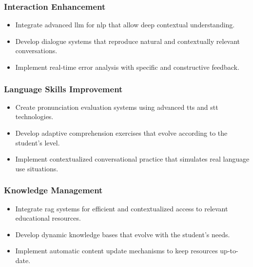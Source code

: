 \subsubsection{Interaction Enhancement}
\label{subsubsec:interaction-enhancement}

\begin{itemize}
  \item Integrate advanced \gls{llm} for \gls{nlp} that allow deep contextual understanding.
  \item Develop dialogue systems that reproduce natural and contextually relevant conversations.
  \item Implement real-time error analysis with specific and constructive feedback.
\end{itemize}

\subsubsection{Language Skills Improvement}
\label{subsubsec:language-skills-improvement}

\begin{itemize}
  \item Create pronunciation evaluation systems using advanced \gls{tts} and \gls{stt} technologies.
  \item Develop adaptive comprehension exercises that evolve according to the student's level.
  \item Implement contextualized conversational practice that simulates real language use situations.
\end{itemize}

\subsubsection{Knowledge Management}
\label{subsubsec:knowledge-management}

\begin{itemize}
  \item Integrate \gls{rag} systems for efficient and contextualized access to relevant educational resources.
  \item Develop dynamic knowledge bases that evolve with the student's needs.
  \item Implement automatic content update mechanisms to keep resources up-to-date.
\end{itemize}
